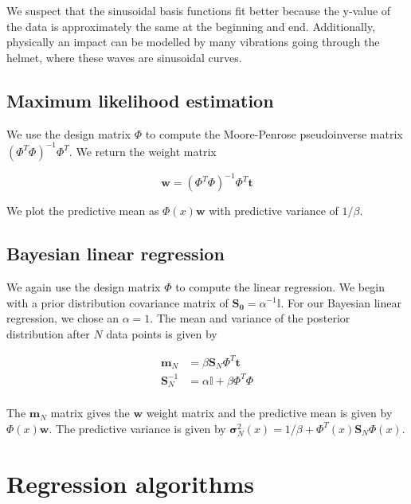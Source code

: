 \documentclass[11pt]{amsart}
\begin{document}
We suspect that the sinusoidal basis functions fit better because the y-value of the data is approximately the same at the beginning and end. Additionally, physically an impact can be modelled by many vibrations going through the helmet, where these waves are sinusoidal curves.\\

\subsection{Maximum likelihood estimation}

We use the design matrix $\Phi$ to compute the Moore-Penrose pseudoinverse matrix $(\Phi ^ T \Phi)^{-1} \Phi ^T$. We return the weight matrix 

$$\mathbf{w} = (\Phi ^ T \Phi)^{-1} \Phi ^T \mathbf{t}$$

We plot the predictive mean as $\Phi(x) \mathbf{w}$ with predictive variance of $1 / \beta$.

\subsection{Bayesian linear regression}

We again use the design matrix $\Phi$ to compute the linear regression. We begin with a prior distribution covariance matrix of $\mathbf{S_0} = \alpha ^{-1} \mathbb{I}$. For our Bayesian linear regression, we chose an $\alpha = 1$. The mean and variance of the posterior distribution after $N$ data points is given by

\begin{align*}
\mathbf{m}_N &= \beta \mathbf{S}_N \Phi ^ T \mathbf{t} \\
\mathbf{S}_N^{-1} &= \alpha \mathbb{I} + \beta \Phi ^ T \Phi \\
\end{align*}

The $\mathbf{m}_N$ matrix gives the $\mathbf{w}$ weight matrix and the predictive mean is given by $\Phi(x) \mathbf{w}$. The predictive variance is given by $\mathbf{\sigma}^2_N(x) = 1 / \beta + \Phi^T(x) \mathbf{S}_N \Phi(x)$. \\

\section{Regression algorithms}
\end{document}
